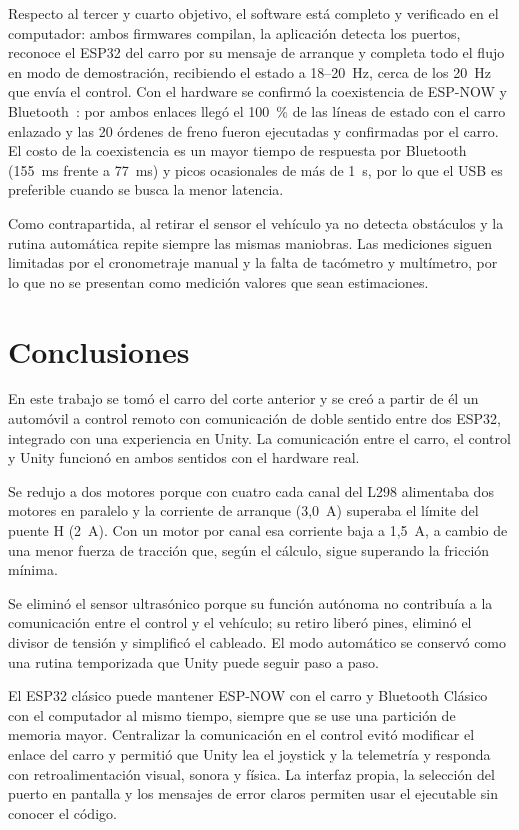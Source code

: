 \documentclass[journal]{IEEEtran}
\begin{document}
Respecto al tercer y cuarto objetivo, el software está completo y verificado en el computador: ambos firmwares compilan, la aplicación detecta los puertos, reconoce el ESP32 del carro por su mensaje de arranque y completa todo el flujo en modo de demostración, recibiendo el estado a 18--20~Hz, cerca de los 20~Hz que envía el control. Con el hardware se confirmó la coexistencia de ESP-NOW y Bluetooth~\cite{coexist}: por ambos enlaces llegó el 100~\% de las líneas de estado con el carro enlazado y las 20 órdenes de freno fueron ejecutadas y confirmadas por el carro. El costo de la coexistencia es un mayor tiempo de respuesta por Bluetooth (155~ms frente a 77~ms) y picos ocasionales de más de 1~s, por lo que el USB es preferible cuando se busca la menor latencia.

Como contrapartida, al retirar el sensor el vehículo ya no detecta obstáculos y la rutina automática repite siempre las mismas maniobras. Las mediciones siguen limitadas por el cronometraje manual y la falta de tacómetro y multímetro, por lo que no se presentan como medición valores que sean estimaciones.

\section{Conclusiones}
En este trabajo se tomó el carro del corte anterior y se creó a partir de él un automóvil a control remoto con comunicación de doble sentido entre dos ESP32, integrado con una experiencia en Unity. La comunicación entre el carro, el control y Unity funcionó en ambos sentidos con el hardware real.

Se redujo a dos motores porque con cuatro cada canal del L298 alimentaba dos motores en paralelo y la corriente de arranque (3,0~A) superaba el límite del puente H (2~A). Con un motor por canal esa corriente baja a 1,5~A, a cambio de una menor fuerza de tracción que, según el cálculo, sigue superando la fricción mínima.

Se eliminó el sensor ultrasónico porque su función autónoma no contribuía a la comunicación entre el control y el vehículo; su retiro liberó pines, eliminó el divisor de tensión y simplificó el cableado. El modo automático se conservó como una rutina temporizada que Unity puede seguir paso a paso.

El ESP32 clásico puede mantener ESP-NOW con el carro y Bluetooth Clásico con el computador al mismo tiempo, siempre que se use una partición de memoria mayor. Centralizar la comunicación en el control evitó modificar el enlace del carro y permitió que Unity lea el joystick y la telemetría y responda con retroalimentación visual, sonora y física. La interfaz propia, la selección del puerto en pantalla y los mensajes de error claros permiten usar el ejecutable sin conocer el código.
\end{document}
